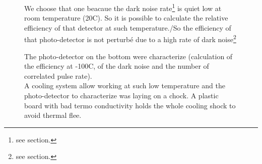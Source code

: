 \documentclass[a4paper, 11pt]{report}%
\begin{document}
\begin{figure}[!hbtp]
  We choose that one beacaue the dark noise rate\footnote{see section.} is quiet low at room temperature (20C). So it is possible 
  to calculate the relative efficiency of that detector at such temperature./So the efficiency of that photo-detector is not perturbé
  due to a high rate of dark noise\footnote{see section.}
  
  The photo-detector on the bottom were characterize (calculation of the efficiency at -100C, of the dark noise and the number of 
  correlated pulse rate).\\
  A cooling system allow working at such low temperature and the photo-detector to characterize was laying on a chock. A plastic board 
  with bad termo conductivity holds the whole cooling shock to avoid thermal flee.\\
    

\end{figure}
\end{document}
